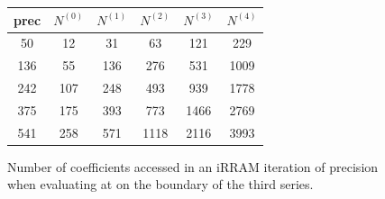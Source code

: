 		\begin{figure}[h]
			 \centering
          \begin{tabular}{|c||c|c|c|c|c|}
          \hline
          prec & $N^{(0)}$ & $N^{(1)}$ &$N^{(2)}$ & $N^{(3)}$ & $N^{(4)}$ \\
          \hline\hline
          50 & 12 & 31 & 63 & 121 & 229\\
          \hline
          136 & 55 & 136 & 276 & 531 & 1009\\
          \hline
          242 & 107 & 248 & 493 & 939 & 1778\\
          \hline
          375 & 175 & 393 & 773 & 1466 & 2769\\
          \hline
          541 & 258 & 571 & 1118 & 2116 & 3993\\
          \hline
          \end{tabular}
			\caption{Number of coefficients accessed in an iRRAM iteration of precision \sprec when evaluating at on the boundary of the third series.}
			\label{fig:xinv coeff 0 dep on n}
		\end{figure}

